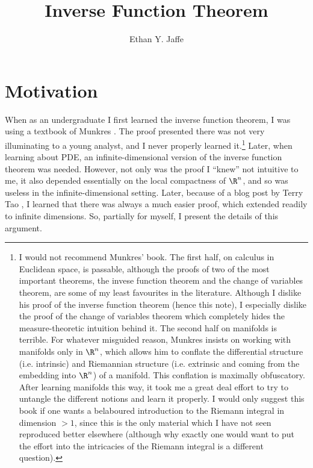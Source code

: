 \documentclass[12pt]{article}
\title{Inverse Function Theorem}
\author{Ethan Y. Jaffe}
\date{}
\begin{document}
\maketitle
\section{Motivation}
When as an undergraduate I first learned the inverse function theorem, I was using a textbook of Munkres \cite{Mun}. The proof presented there was not very illuminating to a young analyst, and I never properly learned it.\footnote{I would not recommend Munkres' book. The first half, on calculus in Euclidean space, is passable, although the proofs of two of the most important theorems, the invese function theorem and the change of variables theorem, are some of my least favourites in the literature. Although I dislike his proof of the inverse function theorem (hence this note), I especially dislike the proof of the change of variables theorem which completely hides the measure-theoretic intuition behind it. The second half on manifolds is terrible. For whatever misguided reason, Munkres insists on working with manifolds only in $\R^n$, which allows him to conflate the differential structure (i.e. intrinsic) and Riemannian structure (i.e. extrinsic and coming from the embedding into $\R^n$) of a manifold. This conflation is maximally obfuscatory. After learning manifolds this way, it took me a great deal effort to try to untangle the different notions and learn it properly. I would only suggest this book if one wants a belaboured introduction to the Riemann integral in dimension $> 1$, since this is the only material which I have not seen reproduced better elsewhere (although why exactly one would want to put the effort into the intricacies of the Riemann integral is a different question).} Later, when learning about PDE, an infinite-dimensional version of the inverse function theorem was needed. However, not only was the proof I ``knew'' not intuitive to me, it also depended essentially on the local compactness of $\R^n$, and so was useless in the infinite-dimensional setting. Later, because of a blog post by Terry Tao \cite{Tao}, I learned that there was always a much easier proof, which extended readily to infinite dimensions. So, partially for myself, I present the details of this argument.
\end{document}
